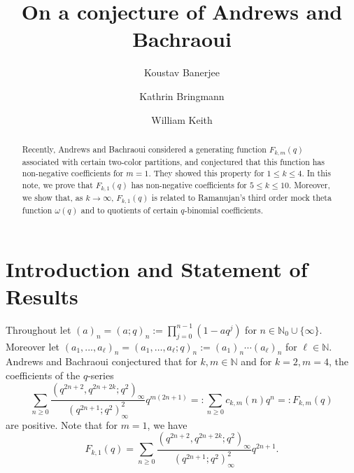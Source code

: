 \documentclass[12pt,reqno]{amsart}
\title{On a conjecture of Andrews and Bachraoui}
\author{Koustav Banerjee}
\author{Kathrin Bringmann}
\author{William Keith}
\newcommand{\N}{\mathbb{N}}
\renewcommand{\o}{{\omega}}
\renewcommand{\(}{\left\(}
\renewcommand{\)}{\right\)}
\numberwithin{equation}{section}
\theoremstyle{plain}
\theoremstyle{definition}
\numberwithin{equation}{section}
\begin{document}
	
	\begin{abstract}
Recently, Andrews and Bachraoui considered a generating function $F_{k,m}(q)$ associated with certain two-color partitions, and conjectured that this function has non-negative coefficients for $m=1$. They showed this property for $1 \leq k \leq 4$.  In this note, we prove that $F_{k,1}(q)$ has non-negative coefficients for $5 \leq k \leq 10$. Moreover, we show that, as $k\to\infty$, $F_{k,1}(q)$ is related to Ramanujan's third order mock theta function $\o(q)$ and to quotients of certain $q$-binomial coefficients.
	\end{abstract}
	
	\maketitle
	
	




\section{Introduction and Statement of Results}
 Throughout let $(a)_n=(a;q)_n:=\prod_{j=0}^{n-1} (1-aq^j)$ for $n\in\N_0\cup\{\infty\}$. Moreover let $(a_1,...,a_\ell)_n=(a_1,\dots,a_\ell;q)_n:=(a_1)_n\cdots(a_\ell)_n$ for $\ell\in\N$. 
Andrews and Bachraoui \cite[Conjecture 2.8 and Conjecture 2.9]{AB} conjectured that for $k,m\in \mathbb{N}$ and for $k=2, m=4$, the coefficients of the $q$-series 
\begin{equation*}
\sum_{n\ge 0} \frac{\left(q^{2n+2},q^{2n+2k};q^2\right)_\infty}{\left(q^{2n+1};q^2\right)^2_\infty} q^{m(2n+1)}=:\sum_{n\ge 0}c_{k,m}(n)q^n=:F_{k,m}(q)
\end{equation*}
are positive. Note that for $m=1$, %
we have 
\begin{equation}\label{def}
F_{k,1}(q)=\sum_{n\ge 0}\frac{\left(q^{2n+2},q^{2n+2k};q^2\right)_\infty}{\left(q^{2n+1};q^2\right)^2_\infty} q^{2n+1}.
\end{equation}
\end{document}

